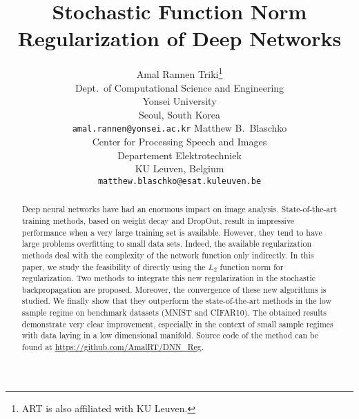 \documentclass{article}
\begin{document}
\title{Stochastic Function Norm Regularization of Deep Networks}
%
%
\author{
  Amal Rannen Triki\thanks{ART is also affiliated with KU Leuven.}\\
  Dept.\ of Computational Science and Engineering\\
  Yonsei University\\
  Seoul, South Korea\\
  \texttt{amal.rannen@yonsei.ac.kr} 
  \And
  Matthew B.\ Blaschko\\
  Center for Processing Speech and Images\\
  Departement Elektrotechniek\\
  KU Leuven, Belgium\\   \texttt{matthew.blaschko@esat.kuleuven.be} \\
}
\maketitle              %

\begin{abstract}
Deep neural networks have had an enormous impact on image analysis. State-of-the-art training methods, based on weight decay and DropOut, result in impressive performance when a very large training set is available. However, they tend to have large problems overfitting to small data sets. Indeed, the available regularization methods deal with the complexity of the network function only indirectly. In this paper, we study the feasibility of directly using the $L_2$ function norm for regularization. Two methods to integrate this new regularization in the stochastic backpropagation are proposed. Moreover, the convergence of these new algorithms is studied. We finally show that they outperform the state-of-the-art methods in the low sample regime on benchmark datasets (MNIST and CIFAR10). The obtained results demonstrate very clear improvement, especially in the context of small sample regimes with data laying in a low dimensional manifold.  Source code of the method can be found at \url{https://github.com/AmalRT/DNN_Reg}.
\end{abstract}
\end{document}
